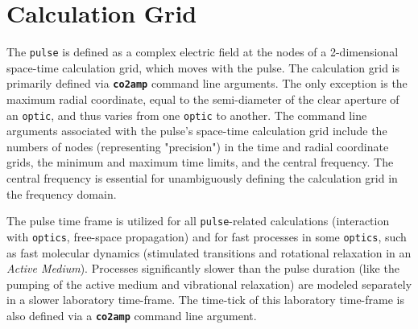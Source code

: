 \documentclass{report}
\begin{document}
\section{Calculation Grid}
The \texttt{pulse} is defined as a complex electric field at the nodes of a 2-dimensional space-time calculation grid, which moves with the pulse. The calculation grid is primarily defined via \textbf{\texttt{co2amp}} command line arguments. The only exception is the maximum radial coordinate, equal to the semi-diameter of the clear aperture of an \texttt{optic}, and thus varies from one \texttt{optic} to another. The command line arguments associated with the pulse's space-time calculation grid include the numbers of nodes (representing "precision") in the time and radial coordinate grids, the minimum and maximum time limits, and the central frequency. The central frequency is essential for unambiguously defining the calculation grid in the frequency domain.

The pulse time frame is utilized for all \texttt{pulse}-related calculations (interaction with \texttt{optics}, free-space propagation) and for fast processes in some \texttt{optics}, such as fast molecular dynamics (stimulated transitions and rotational relaxation in an \textit{Active Medium}). Processes significantly slower than the pulse duration (like the pumping of the active medium and vibrational relaxation) are modeled separately in a slower laboratory time-frame. The time-tick of this laboratory time-frame is also defined via a \textbf{\texttt{co2amp}} command line argument.
\end{document}
